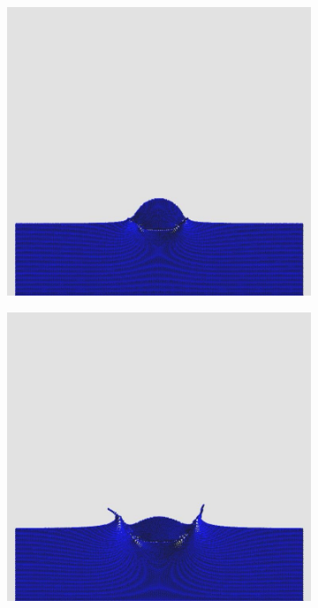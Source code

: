 \documentclass[12pt,a4paper,dvipsnames]{article}
\begin{document}
\begin{figure}[!h]
\begin{subfigure}[!h]{0.3\textwidth}
	\end{subfigure}
	\begin{subfigure}[!h]{0.3\textwidth} \centering
		\includegraphics[width=\textwidth]{WD/WD-03.jpg}
	\end{subfigure}
	\begin{subfigure}[!h]{0.3\textwidth} \centering
		\includegraphics[width=\textwidth]{WD/WD-04.jpg}

\end{subfigure}
\end{figure}
\end{document}
